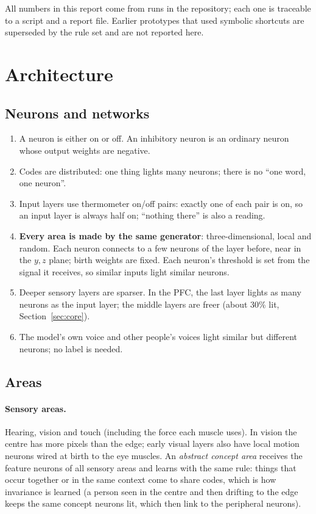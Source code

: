 \documentclass[11pt]{article}
\begin{document}
All numbers in this report come from runs in the repository; each one is traceable to a script and a report file.
Earlier prototypes that used symbolic shortcuts are superseded by the rule set and are not reported here.

\section{Architecture}\label{sec:arch}

\subsection{Neurons and networks}
\begin{enumerate}
\item A neuron is either on or off. An inhibitory neuron is an ordinary neuron whose output weights are negative.
\item Codes are distributed: one thing lights many neurons; there is no ``one word, one neuron''.
\item Input layers use thermometer on/off pairs: exactly one of each pair is on, so an input layer is always half on;
``nothing there'' is also a reading.
\item \textbf{Every area is made by the same generator}: three-dimensional, local and random. Each neuron connects to a
few neurons of the layer before, near in the $y,z$ plane; birth weights are fixed. Each neuron's threshold is set from
the signal it receives, so similar inputs light similar neurons.
\item Deeper sensory layers are sparser. In the PFC, the last layer lights as many neurons as the input layer; the
middle layers are freer (about 30\% lit, Section~\ref{sec:core}).
\item The model's own voice and other people's voices light similar but different neurons; no label is needed.
\end{enumerate}

\subsection{Areas}
\paragraph{Sensory areas.} Hearing, vision and touch (including the force each muscle uses). In vision the centre has
more pixels than the edge; early visual layers also have local motion neurons wired at birth to the eye muscles. An
\emph{abstract concept area} receives the feature neurons of all sensory areas and learns with the same rule: things that
occur together or in the same context come to share codes, which is how invariance is learned (a person seen in the
centre and then drifting to the edge keeps the same concept neurons lit, which then link to the peripheral neurons).
\end{document}

